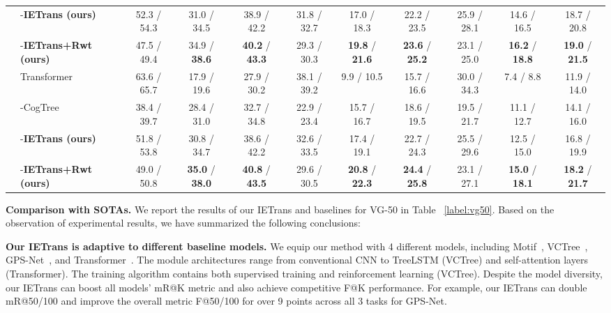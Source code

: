 \documentclass[runningheads]{llncs}
\begin{document}
\begin{table*}[t]
\begin{center}
{\begin{tabular}{ll ccc ccc ccc}
 &  \quad -\textbf{IETrans (ours)} & 52.3 / 54.3 & 31.0 / 34.5 & 38.9 / 42.2 & 31.8 / 32.7 & 17.0 / 18.3 & 22.2 / 23.5 & 25.9 / 28.1 & 14.6 / 16.5 & 18.7 / 20.8  \\
  &  \quad -\textbf{IETrans+Rwt (ours)} & 47.5 / 49.4 & 34.9 / \textbf{38.6} & \textbf{40.2} / \textbf{43.3} & 29.3 / 30.3 & \textbf{19.8} / \textbf{21.6} & \textbf{23.6} / \textbf{25.2} & 23.1 / 25.0 & \textbf{16.2} / \textbf{18.8} & \textbf{19.0} / \textbf{21.5} \\
\cmidrule{2-11}
&  Transformer~\cite{tang2020unbiased} & 63.6 / 65.7 & 17.9 / 19.6 & 27.9 / 30.2 & 38.1 / 39.2 & 9.9 / 10.5 & 15.7 / 16.6 & 30.0 / 34.3 & 7.4 / 8.8 & 11.9 / 14.0  \\
 &  \quad -CogTree~\cite{yu2020cogtree} & 38.4 / 39.7  & 28.4 / 31.0  & 32.7 / 34.8 & 22.9 / 23.4 & 15.7 / 16.7 & 18.6 / 19.5 & 19.5 / 21.7 & 11.1 / 12.7  & 14.1 / 16.0 \\
&  \quad -\textbf{IETrans (ours)} & 51.8 / 53.8 & 30.8 / 34.7 & 38.6 / 42.2 & 32.6 / 33.5 & 17.4 / 19.1 & 22.7 / 24.3 & 25.5 / 29.6 & 12.5 / 15.0 & 16.8 / 19.9  \\
 &  \quad -\textbf{IETrans+Rwt (ours)} & 49.0 / 50.8 & \textbf{35.0} / \textbf{38.0} & \textbf{40.8} / \textbf{43.5} & 29.6 / 30.5 & \textbf{20.8} / \textbf{22.3} & \textbf{24.4} / \textbf{25.8} & 23.1 / 27.1 & \textbf{15.0} / \textbf{18.1} & \textbf{18.2} / \textbf{21.7} \\
    \bottomrule
    \end{tabular}
    }
    \end{center}
\end{table*}

\smallskip
\noindent
\textbf{Comparison with SOTAs.}
We report the results of our IETrans and baselines for VG-50 in Table ~\ref{label:vg50}.
Based on the observation of experimental results, we have summarized the following conclusions:

\textbf{Our IETrans is adaptive to different baseline models.}
We equip our method with 4 different models, including Motif~\cite{zellers2018motif}, VCTree~\cite{tang2019learning}, GPS-Net~\cite{lin2020gps}, and Transformer~\cite{tang2020unbiased}.
The module architectures range from conventional CNN to TreeLSTM (VCTree) and self-attention layers (Transformer).
The training algorithm contains both supervised training and reinforcement learning (VCTree).
Despite the model diversity, our IETrans can boost all models' mR@K metric and also achieve competitive F@K performance.
For example, our IETrans can double mR@50/100 and improve the overall metric F@50/100 for over 9 points across all 3 tasks for GPS-Net. 
\end{document}
